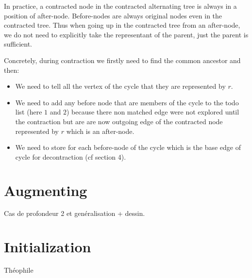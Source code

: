 \documentclass[a4paper,12pt]{article}
\renewcommand{\(}{\left(}
\renewcommand{\)}{\right)}
\begin{document}
In practice, a contracted node in the contracted alternating tree is always in a
position of after-node. Before-nodes are always original nodes even in the
contracted tree. Thus when going up in the contracted tree from an after-node,
we do not need to explicitly take the representant of the parent, just the
parent is sufficient.


Concretely, during contraction we firstly need to find the common ancestor and
then:
\begin{itemize}
\item We need to tell all the vertex of the cycle that they are represented by
  $r$.
\item We need to add any before node that are members of the cycle
to the todo list (here $1$ and $2$) because there non matched edge were not
explored until the contraction but are are now outgoing edge of the contracted
node represented by $r$ which is an after-node.
\item We need to store for each before-node of the cycle which is the base edge
  of cycle for decontraction (cf section 4).
\end{itemize}

\section{Augmenting}



Cas de profondeur 2 et genéralisation + dessin.

\section{Initialization}

Théophile
\end{document}
